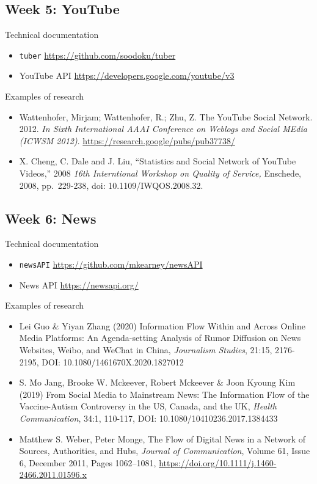\documentclass[11pt,]{article}
\providecommand{\tightlist}{%
  \setlength{\itemsep}{0pt}\setlength{\parskip}{0pt}}
\begin{document}
\hypertarget{week-5-youtube}{%
\subsection{Week 5: YouTube}\label{week-5-youtube}}

Technical documentation

\begin{itemize}
\tightlist
\item
  \texttt{tuber} \url{https://github.com/soodoku/tuber}
\item
  YouTube API \url{https://developers.google.com/youtube/v3}
\end{itemize}

Examples of research

\begin{itemize}
\tightlist
\item
  Wattenhofer, Mirjam; Wattenhofer, R.; Zhu, Z. The YouTube Social
  Network. 2012. \emph{In Sixth International AAAI Conference on Weblogs
  and Social MEdia (ICWSM 2012)}.
  \url{https://research.google/pubs/pub37738/}
\item
  X. Cheng, C. Dale and J. Liu, ``Statistics and Social Network of
  YouTube Videos,'' 2008 \emph{16th Interntional Workshop on Quality of
  Service,} Enschede, 2008, pp.~229-238, doi: 10.1109/IWQOS.2008.32.
\end{itemize}

\hypertarget{week-6-news}{%
\subsection{Week 6: News}\label{week-6-news}}

Technical documentation

\begin{itemize}
\tightlist
\item
  \texttt{newsAPI} \url{https://github.com/mkearney/newsAPI}
\item
  News API \url{https://newsapi.org/}
\end{itemize}

Examples of research

\begin{itemize}
\tightlist
\item
  Lei Guo \& Yiyan Zhang (2020) Information Flow Within and Across
  Online Media Platforms: An Agenda-setting Analysis of Rumor Diffusion
  on News Websites, Weibo, and WeChat in China, \emph{Journalism
  Studies}, 21:15, 2176-2195, DOI: 10.1080/1461670X.2020.1827012
\item
  S. Mo Jang, Brooke W. Mckeever, Robert Mckeever \& Joon Kyoung Kim
  (2019) From Social Media to Mainstream News: The Information Flow of
  the Vaccine-Autism Controversy in the US, Canada, and the UK,
  \emph{Health Communication}, 34:1, 110-117, DOI:
  10.1080/10410236.2017.1384433
\item
  Matthew S. Weber, Peter Monge, The Flow of Digital News in a Network
  of Sources, Authorities, and Hubs, \emph{Journal of Communication},
  Volume 61, Issue 6, December 2011, Pages 1062--1081,
  \url{https://doi.org/10.1111/j.1460-2466.2011.01596.x}
\end{itemize}
\end{document}
